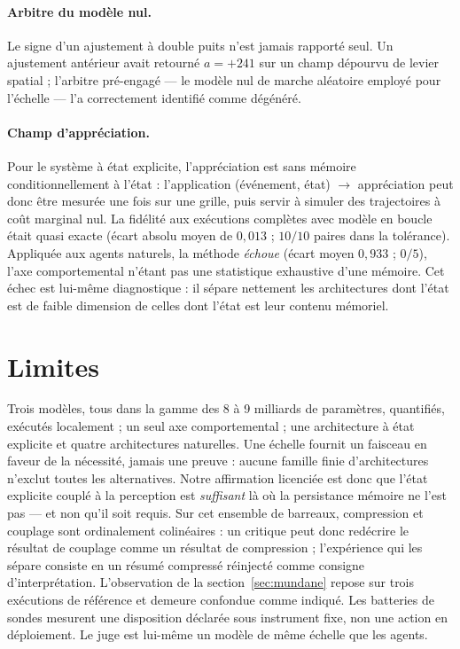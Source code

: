\documentclass[11pt]{article}
\begin{document}
\paragraph{Arbitre du modèle nul.} Le signe d'un ajustement à double puits n'est jamais
rapporté seul. Un ajustement antérieur avait retourné $a = +241$ sur un champ dépourvu
de levier spatial ; l'arbitre pré-engagé --- le modèle nul de marche aléatoire employé
pour l'échelle --- l'a correctement identifié comme dégénéré.

\paragraph{Champ d'appréciation.} Pour le système à état explicite, l'appréciation est
sans mémoire conditionnellement à l'état : l'application (événement, état)
$\rightarrow$ appréciation peut donc être mesurée une fois sur une grille, puis servir
à simuler des trajectoires à coût marginal nul. La fidélité aux exécutions complètes
avec modèle en boucle était quasi exacte (écart absolu moyen de $0{,}013$ ; $10/10$
paires dans la tolérance). Appliquée aux agents naturels, la méthode \emph{échoue}
(écart moyen $0{,}933$ ; $0/5$), l'axe comportemental n'étant pas une statistique
exhaustive d'une mémoire. Cet échec est lui-même diagnostique : il sépare nettement les
architectures dont l'état est de faible dimension de celles dont l'état est leur contenu
mémoriel.

\section{Limites}

Trois modèles, tous dans la gamme des 8 à 9 milliards de paramètres, quantifiés,
exécutés localement ; un seul axe comportemental ; une architecture à état explicite et
quatre architectures naturelles. Une échelle fournit un faisceau en faveur de la
nécessité, jamais une preuve : aucune famille finie d'architectures n'exclut toutes les
alternatives. Notre affirmation licenciée est donc que l'état explicite couplé à la
perception est \emph{suffisant} là où la persistance mémoire ne l'est pas --- et non
qu'il soit requis. Sur cet ensemble de barreaux, compression et couplage sont
ordinalement colinéaires : un critique peut donc redécrire le résultat de couplage
comme un résultat de compression ; l'expérience qui les sépare consiste en un résumé
compressé réinjecté comme consigne d'interprétation. L'observation de la
section~\ref{sec:mundane} repose sur trois exécutions de référence et demeure confondue
comme indiqué. Les batteries de sondes mesurent une disposition déclarée sous
instrument fixe, non une action en déploiement. Le juge est lui-même un modèle de même
échelle que les agents.
\end{document}
